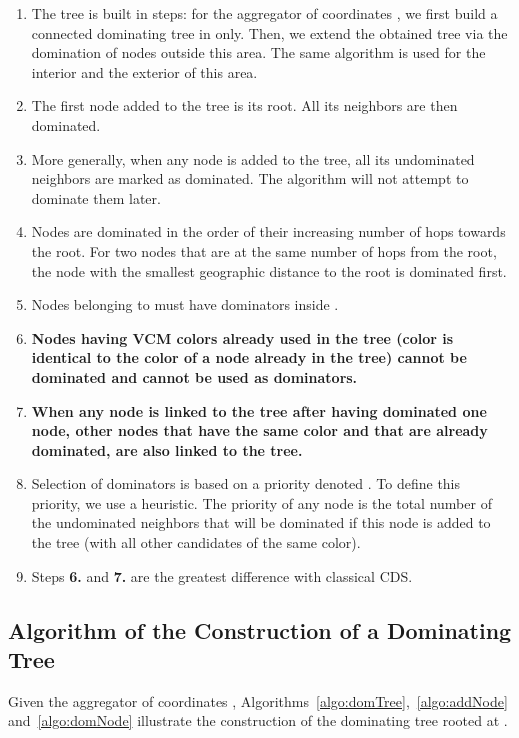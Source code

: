 \begin{enumerate}
\item The tree is built in  steps: for the aggregator  of coordinates  , we first build a connected dominating tree in  only. Then, we extend the obtained tree via the domination of nodes outside this area. The same algorithm is used for the interior and the exterior of this area.
\item The first node added to the tree is its root. All its neighbors are then dominated. 
\item More generally, when any node is added to the tree, all its undominated neighbors are marked as dominated. The algorithm will not attempt to dominate them later.\item Nodes are dominated in the order of their increasing number of hops towards the root. For two nodes that are at the same number of hops from the root, the node with the smallest geographic distance to the root is dominated first.
\item Nodes belonging to  must have dominators inside .

\item \textbf{Nodes having VCM colors already used in the tree (color is identical to the color of a node already in the tree) cannot be dominated and cannot be used as dominators.}



\item \textbf{When any node  is linked to the tree after having dominated one node, other nodes that have the same color and that are already dominated, are also linked to the tree.}


\item Selection of dominators is based on a priority denoted . To define this priority, we use a heuristic. The priority of any node is the total number of the undominated neighbors that will be dominated if this node is added to the tree (with all other candidates of the same color).
\item Steps {\bf 6.} and {\bf 7.} are the greatest difference with classical CDS.
\end{enumerate}



\subsection{Algorithm of the Construction of a Dominating Tree}
Given the aggregator  of coordinates , Algorithms~\ref{algo:domTree},~\ref{algo:addNode}  and~\ref{algo:domNode} illustrate the construction of the dominating tree  rooted at .



